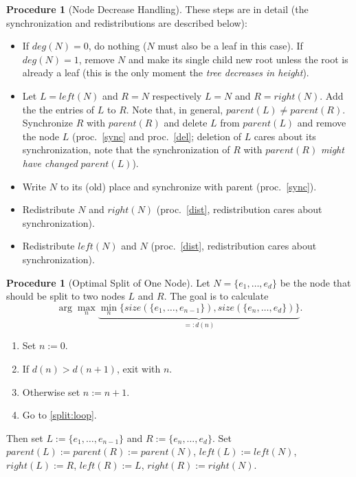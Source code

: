 \documentclass[a4paper, 8pt]{scrartcl}
\theoremstyle{plain}
\theoremstyle{definition}
\newtheorem{proc}[thm]{Procedure}
\theoremstyle{remark}
\begin{document}
\begin{multicols}{2}
\begin{proc}[Node Decrease Handling]
These steps are in detail (the synchronization and redistributions are 
described below):
\begin{itemize}
\item[ad 1:] If \mbox{$deg(N) = 0$}, do nothing ($N$ must also be a leaf in
	this case).
	If \mbox{$deg(N) = 1$}, remove $N$ and make its single child new root
	unless the root is already a leaf (this is the only moment the 
	{\em tree decreases in height}).
\item[ad 2+3:] Let \mbox{$L = left(N)$} and \mbox{$R = N$} respectively
	\mbox{$L = N$} and $R = right(N)$.
	Add the the entries of $L$ to $R$.
	Note that, in general, \mbox{$parent(L) \neq parent(R)$}.
	Synchronize $R$ with $parent(R)$ and delete $L$ from $parent(L)$
	and remove the node $L$ 
	(proc.~\ref{sync} and proc.~\ref{del}; deletion of $L$ cares about its
	synchronization, note that the synchronization of $R$ with $parent(R)$
	{\em might have changed} $parent(L)$).
\item[ad 4:] Write $N$ to its (old) place and synchronize with parent
	(proc.~\ref{sync}).
\item[ad 5:] Redistribute $N$ and $right(N)$ (proc.~\ref{dist},
	redistribution cares about synchronization).
\item[ad 6:] Redistribute $left(N)$ and $N$ (proc.~\ref{dist},
	redistribution cares about synchronization).
\end{itemize}
\end{proc}


\begin{proc}[Optimal Split of One Node] \label{split}
Let \mbox{$N = \{ e_1, \ldots, e_d \}$} be the node that should be split to
two nodes $L$ and $R$.
The goal is to calculate
\[ \arg \max_n \underbrace{\min_n \{ size(\{e_1, \ldots, e_{n-1}\}),
	size(\{e_n, \ldots, e_d\}) \}}_{=: d(n)}. \]
\begin{enumerate}
\item Set \mbox{$n := 0$}.
\item \label{split:loop} If \mbox{$d(n) > d(n+1)$}, exit with $n$.
\item Otherwise set \mbox{$n := n + 1$}. 
\item Go to \ref{split:loop}.
\end{enumerate}
Then set \mbox{$L := \{e_1, \ldots, e_{n-1}\}$}
and \mbox{$R := \{e_n, \ldots, e_d\}$}.
Set \mbox{$parent(L) := parent(R) := parent(N)$}, \mbox{$left(L) := left(N)$},
\mbox{$right(L) := R$}, \mbox{$left(R) := L$}, \mbox{$right(R) := right(N)$}.


\end{proc}
\end{multicols}
\end{document}
